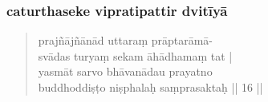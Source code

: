 \documentclass[12pt]{article}
\begin{document}
% 
 
\subsubsection{caturthaseke vipratipattir dvitīyā}
\begin{quote}
	prajñājñānād uttaraṃ prāptarāmā-\\
	svādas turyaṃ sekam āhādhamaṃ tat |\\
	yasmāt sarvo bhāvanādau prayatno \\
	buddhoddiṣṭo niṣphalaḥ saṃprasaktaḥ || 16 ||

% 
\end{quote}
\end{document}
